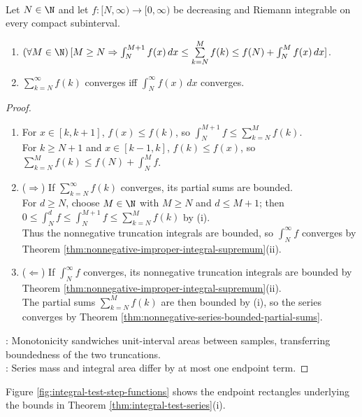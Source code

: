 \begin{theorem} \label{thm:integral-test-series} \\
Let $N\in\N$ and let $f:[N,\infty)\to[0,\infty)$ be decreasing and Riemann integrable on every compact subinterval.
\begin{enumerate}[label=(\roman*)]
\setlength{\itemsep}{0pt}
\item $(\forall M\in\N)\,[M\geq N\Rightarrow\int_N^{M+1}f(x)\,dx\leq\sum\limits_{k=N}^{M}f(k)\leq f(N)+\int_N^M f(x)\,dx]$.
\item $\sum\limits_{k=N}^{\infty}f(k)$ converges iff $\int_N^\infty f(x)\,dx$ converges.
\end{enumerate}
\begin{proof}
\begin{enumerate}[label=(\roman*)]
\setlength{\itemsep}{0pt}
\item[$(i)$] For $x\in[k,k+1]$, $f(x)\leq f(k)$, so $\int_N^{M+1}f\leq\sum\limits_{k=N}^{M}f(k)$.\\
For $k\geq N+1$ and $x\in[k-1,k]$, $f(k)\leq f(x)$, so $\sum\limits_{k=N}^{M}f(k)\leq f(N)+\int_N^M f$.
\item[$(ii)$] ($\Rightarrow$) If $\sum\limits_{k=N}^{\infty}f(k)$ converges, its partial sums are bounded.\\
For $d\geq N$, choose $M\in\N$ with $M\geq N$ and $d\leq M+1$; then $0\leq\int_N^d f\leq\int_N^{M+1}f\leq\sum\limits_{k=N}^{M}f(k)$ by (i).\\
Thus the nonnegative truncation integrals are bounded, so $\int_N^\infty f$ converges by Theorem \ref{thm:nonnegative-improper-integral-supremum}(ii).
\item[$(ii)$] ($\Leftarrow$) If $\int_N^\infty f$ converges, its nonnegative truncation integrals are bounded by Theorem \ref{thm:nonnegative-improper-integral-supremum}(ii).\\
The partial sums $\sum\limits_{k=N}^{M}f(k)$ are then bounded by (i), so the series converges by Theorem \ref{thm:nonnegative-series-bounded-partial-sums}.
\end{enumerate}
: Monotonicity sandwiches unit-interval areas between samples, transferring boundedness of the two truncations.\\
: Series mass and integral area differ by at most one endpoint term.
\end{proof}
\end{theorem}

Figure \ref{fig:integral-test-step-functions} shows the endpoint rectangles underlying the bounds in Theorem \ref{thm:integral-test-series}(i).

